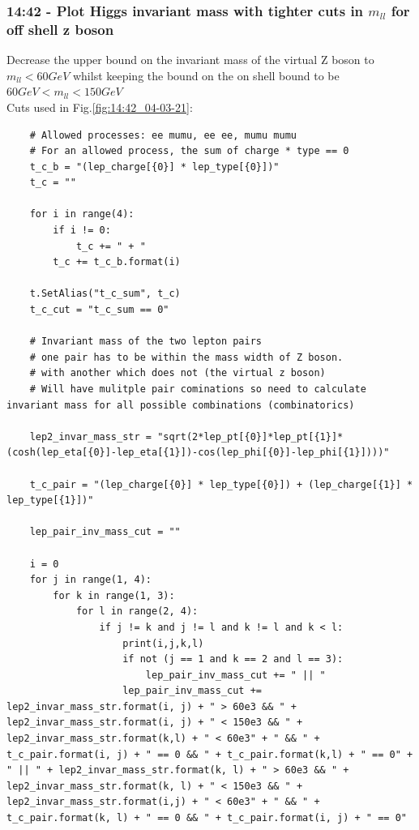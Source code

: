 \subsubsection{14:42 - Plot Higgs invariant mass with tighter cuts in $m_{ll}$ for off shell z boson}
Decrease the upper bound on the invariant mass of the virtual Z boson to $m_{ll} < 60GeV$ whilst keeping the bound on the on shell bound to be $60GeV < m_{ll} < 150 GeV$
\\
Cuts used in Fig.\ref{fig:14:42_04-03-21}:
\begin{lstlisting}
    # Allowed processes: ee mumu, ee ee, mumu mumu
    # For an allowed process, the sum of charge * type == 0 
    t_c_b = "(lep_charge[{0}] * lep_type[{0}])"  
    t_c = ""
    
    for i in range(4):
        if i != 0:
            t_c += " + "
        t_c += t_c_b.format(i)

    t.SetAlias("t_c_sum", t_c)
    t_c_cut = "t_c_sum == 0"
    
    # Invariant mass of the two lepton pairs 
    # one pair has to be within the mass width of Z boson.
    # with another which does not (the virtual z boson)
    # Will have mulitple pair cominations so need to calculate invariant mass for all possible combinations (combinatorics)

    lep2_invar_mass_str = "sqrt(2*lep_pt[{0}]*lep_pt[{1}]*(cosh(lep_eta[{0}]-lep_eta[{1}])-cos(lep_phi[{0}]-lep_phi[{1}])))"

    t_c_pair = "(lep_charge[{0}] * lep_type[{0}]) + (lep_charge[{1}] * lep_type[{1}])"

    lep_pair_inv_mass_cut = ""

    i = 0
    for j in range(1, 4):
        for k in range(1, 3):
            for l in range(2, 4):
                if j != k and j != l and k != l and k < l:
                    print(i,j,k,l)
                    if not (j == 1 and k == 2 and l == 3):
                        lep_pair_inv_mass_cut += " || "
                    lep_pair_inv_mass_cut += lep2_invar_mass_str.format(i, j) + " > 60e3 && " + lep2_invar_mass_str.format(i, j) + " < 150e3 && " + lep2_invar_mass_str.format(k,l) + " < 60e3" + " && " + t_c_pair.format(i, j) + " == 0 && " + t_c_pair.format(k,l) + " == 0" + " || " + lep2_invar_mass_str.format(k, l) + " > 60e3 && " + lep2_invar_mass_str.format(k, l) + " < 150e3 && " + lep2_invar_mass_str.format(i,j) + " < 60e3" + " && " + t_c_pair.format(k, l) + " == 0 && " + t_c_pair.format(i, j) + " == 0"
    

\end{lstlisting}
